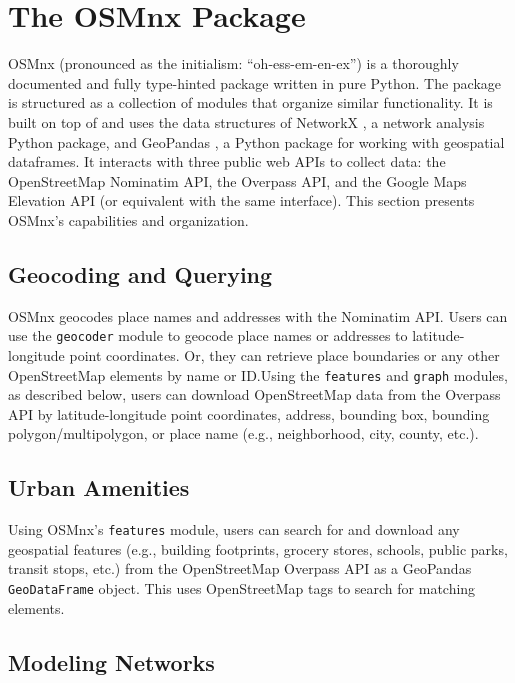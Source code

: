 \documentclass[12pt,letterpaper]{article} %
\begin{document}
\section{The OSMnx Package}

OSMnx (pronounced as the initialism: \enquote{oh-ess-em-en-ex}) is a thoroughly documented and fully type-hinted package written in pure Python. The package is structured as a collection of modules that organize similar functionality. It is built on top of and uses the data structures of NetworkX \citep{hagberg_exploring_2008}, a network analysis Python package, and GeoPandas \citep{joris_van_den_bossche_2024_11080352}, a Python package for working with geospatial dataframes. It interacts with three public web APIs to collect data: the OpenStreetMap Nominatim API, the Overpass API, and the Google Maps Elevation API (or equivalent with the same interface). This section presents OSMnx's capabilities and organization.

\subsection{Geocoding and Querying}

OSMnx geocodes place names and addresses with the Nominatim API\@. Users can use the \texttt{geocoder} module to geocode place names or addresses to latitude-longitude point coordinates. Or, they can retrieve place boundaries or any other OpenStreetMap elements by name or ID.\@ Using the \texttt{features} and \texttt{graph} modules, as described below, users can download OpenStreetMap data from the Overpass API by latitude-longitude point coordinates, address, bounding box, bounding polygon/multipolygon, or place name (e.g., neighborhood, city, county, etc.).

\subsection{Urban Amenities}

Using OSMnx's \texttt{features} module, users can search for and download any geospatial features (e.g., building footprints, grocery stores, schools, public parks, transit stops, etc.) from the OpenStreetMap Overpass API as a GeoPandas \texttt{GeoDataFrame} object. This uses OpenStreetMap tags to search for matching elements.

\subsection{Modeling Networks}
\end{document}
